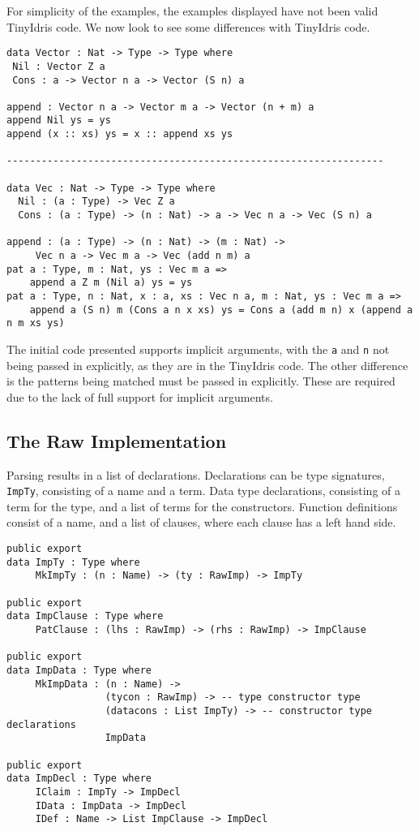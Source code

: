 \documentclass[a4paper]{article}
\begin{document}
For simplicity of the examples, the examples displayed have not been valid TinyIdris code. 
We now look to see some differences with TinyIdris code. 

\begin{center}
\begin{verbatim}
data Vector : Nat -> Type -> Type where
 Nil : Vector Z a
 Cons : a -> Vector n a -> Vector (S n) a

append : Vector n a -> Vector m a -> Vector (n + m) a
append Nil ys = ys
append (x :: xs) ys = x :: append xs ys

-----------------------------------------------------------------

data Vec : Nat -> Type -> Type where
  Nil : (a : Type) -> Vec Z a
  Cons : (a : Type) -> (n : Nat) -> a -> Vec n a -> Vec (S n) a

append : (a : Type) -> (n : Nat) -> (m : Nat) -> 
	 Vec n a -> Vec m a -> Vec (add n m) a
pat a : Type, m : Nat, ys : Vec m a =>
	append a Z m (Nil a) ys = ys
pat a : Type, n : Nat, x : a, xs : Vec n a, m : Nat, ys : Vec m a =>
	append a (S n) m (Cons a n x xs) ys = Cons a (add m n) x (append a n m xs ys)
\end{verbatim}
\end{center}

The initial code presented supports implicit arguments, with the \texttt{a} and \texttt{n}
not being passed in explicitly, as they are in the TinyIdris code. The other difference
is the patterns being matched must be passed in explicitly. These are required due to the 
lack of full support for implicit arguments.
\subsection{The Raw Implementation}
\label{sec:org19ce998}
Parsing results in a list of declarations. Declarations can be type 
signatures, \texttt{ImpTy}, consisting of a name and a term. Data type 
declarations, consisting of a term for the type, and a list of terms 
for the constructors. Function definitions consist of a name, and a
list of clauses, where each clause has a left hand side. 

\begin{center}
\begin{verbatim}
public export
data ImpTy : Type where
	 MkImpTy : (n : Name) -> (ty : RawImp) -> ImpTy

public export
data ImpClause : Type where
	 PatClause : (lhs : RawImp) -> (rhs : RawImp) -> ImpClause

public export
data ImpData : Type where
	 MkImpData : (n : Name) -> 
				 (tycon : RawImp) -> -- type constructor type
				 (datacons : List ImpTy) -> -- constructor type declarations
				 ImpData

public export
data ImpDecl : Type where
	 IClaim : ImpTy -> ImpDecl
	 IData : ImpData -> ImpDecl
	 IDef : Name -> List ImpClause -> ImpDecl
\end{verbatim}
\end{center}
\end{document}
